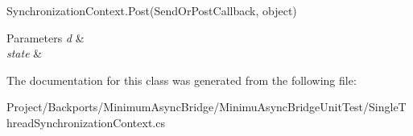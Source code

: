 Synchronization\+Context.\+Post(\+Send\+Or\+Post\+Callback, object) 


\begin{DoxyParams}{Parameters}
{\em d} & \\
\hline
{\em state} & \\
\hline
\end{DoxyParams}


The documentation for this class was generated from the following file\+:\begin{DoxyCompactItemize}
\item 
Project/\+Backports/\+Minimum\+Async\+Bridge/\+Minimu\+Async\+Bridge\+Unit\+Test/Single\+Thread\+Synchronization\+Context.\+cs\end{DoxyCompactItemize}
